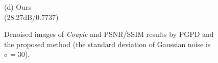 \documentclass[runningheads]{llncs}
\begin{document}
\begin{figure}
{\begin{minipage}[t]{0.244\textwidth}
{\footnotesize (d) Ours \\(28.27dB/0.7737)}
\end{minipage}
}
\caption{Denoised images of \textsl{Couple} and PSNR/SSIM results by PGPD and the proposed method (the standard deviation of Gaussian noise is $\sigma=30$).}
\label{fig22}
\end{figure}

\begin{figure}
\centering
{}
\end{figure}
\end{document}
